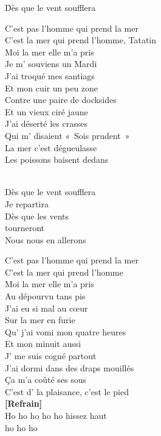 \documentclass{novel}
\begin{document}
\newpage
\scriptsize
\h*{Dès que le vent soufflera}

\begin{multicols}{3}

C'est pas l'homme qui prend la mer \\
C'est la mer qui prend l'homme, Tatatin \\
Moi la mer elle m'a pris \\
Je m' souviens un Mardi \\
J'ai troqué mes santiags \\
Et mon cuir un peu zone \\
Contre une paire de docksides \\
Et un vieux ciré jaune \\
J'ai déserté les crasses \\
Qui m' disaient «~Sois prudent~» \\
La mer c'est dégueulasse \\
Les poissons baisent dedans \\

\begin{bfseries}
[Refrain:]\\
Dès que le vent soufflera \\
Je repartira \\
Dès que les vents \\
tourneront \\
Nous nous en allerons \\
\end{bfseries}

C'est pas l'homme qui prend la mer \\
C'est la mer qui prend l'homme \\
Moi la mer elle m'a pris \\
Au dépourvu tans pis \\
J'ai eu si mal au cœur \\
Sur la mer en furie \\
Qu' j'ai vomi mon quatre heures \\
Et mon minuit aussi \\
J' me suis cogné partout \\
J'ai dormi dans des draps mouillés \\
Ça m'a coûté ses sous \\
C'est d' la plaisance, c'est le pied \\

\textbf{[Refrain]} \\

Ho ho ho ho ho hissez haut \\
ho ho ho \\


\end{multicols}
\end{document}

